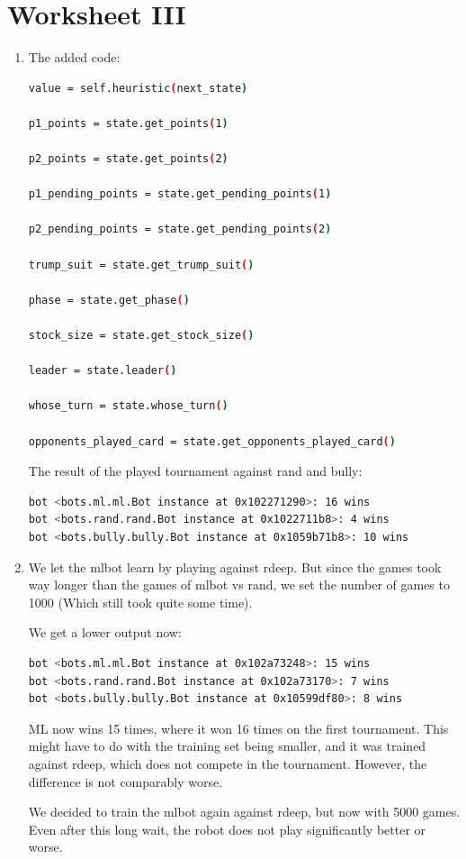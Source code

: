 \documentclass[a4paper,11pt]{article}
\begin{document}
\section{Worksheet III}
\begin{enumerate}
\item The added code:
\begin{lstlisting}[language=bash]
value = self.heuristic(next_state)

p1_points = state.get_points(1)

p2_points = state.get_points(2)

p1_pending_points = state.get_pending_points(1)

p2_pending_points = state.get_pending_points(2)

trump_suit = state.get_trump_suit()

phase = state.get_phase()

stock_size = state.get_stock_size()

leader = state.leader()

whose_turn = state.whose_turn()

opponents_played_card = state.get_opponents_played_card()
\end{lstlisting}
The result of the played tournament against rand and bully:
\begin{lstlisting}[language=bash]
bot <bots.ml.ml.Bot instance at 0x102271290>: 16 wins
bot <bots.rand.rand.Bot instance at 0x1022711b8>: 4 wins
bot <bots.bully.bully.Bot instance at 0x1059b71b8>: 10 wins
\end{lstlisting}

\item We let the mlbot learn by playing against rdeep. But since the games took way longer than the games of mlbot vs rand, we set the number of games to 1000 (Which still took quite some time).

We get a lower output now:
\begin{lstlisting}[language=bash]
bot <bots.ml.ml.Bot instance at 0x102a73248>: 15 wins
bot <bots.rand.rand.Bot instance at 0x102a73170>: 7 wins
bot <bots.bully.bully.Bot instance at 0x10599df80>: 8 wins
\end{lstlisting}

ML now wins 15 times, where it won 16 times on the first tournament. This might have to do with the training set being smaller, and it was trained against rdeep, which does not compete in the tournament. However, the difference is not comparably worse.

We decided to train the mlbot again against rdeep, but now with 5000 games. 
Even after this long wait, the robot does not play significantly better or worse.


\end{enumerate}
\end{document}
